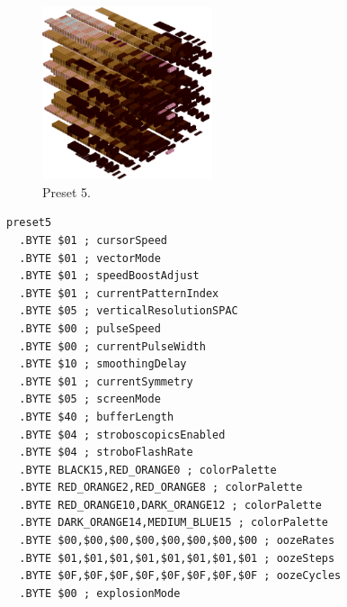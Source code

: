\vspace*{0.5cm}
\begin{minipage}[b]{0.48\linewidth}
\begin{figure}[H]                                                          
  \centering                                                             
  \begin{adjustbox}{width=5cm,center}                                   
  \includegraphics[width=5cm]{src/colorspace_presets/preset5-45.png}%
  \end{adjustbox}                                                        
\caption*{Preset 5.}                                           
\end{figure}                                                               
\end{minipage}
\hspace{0.1cm}
\begin{minipage}[b]{0.48\linewidth}                                                                         
\begin{lstlisting}[basicstyle=\ttfamily\tiny]
preset5
  .BYTE $01 ; cursorSpeed
  .BYTE $01 ; vectorMode
  .BYTE $01 ; speedBoostAdjust
  .BYTE $01 ; currentPatternIndex
  .BYTE $05 ; verticalResolutionSPAC
  .BYTE $00 ; pulseSpeed
  .BYTE $00 ; currentPulseWidth
  .BYTE $10 ; smoothingDelay
  .BYTE $01 ; currentSymmetry
  .BYTE $05 ; screenMode
  .BYTE $40 ; bufferLength
  .BYTE $04 ; stroboscopicsEnabled
  .BYTE $04 ; stroboFlashRate
  .BYTE BLACK15,RED_ORANGE0 ; colorPalette
  .BYTE RED_ORANGE2,RED_ORANGE8 ; colorPalette
  .BYTE RED_ORANGE10,DARK_ORANGE12 ; colorPalette
  .BYTE DARK_ORANGE14,MEDIUM_BLUE15 ; colorPalette
  .BYTE $00,$00,$00,$00,$00,$00,$00,$00 ; oozeRates
  .BYTE $01,$01,$01,$01,$01,$01,$01,$01 ; oozeSteps
  .BYTE $0F,$0F,$0F,$0F,$0F,$0F,$0F,$0F ; oozeCycles
  .BYTE $00 ; explosionMode
\end{lstlisting}
\end{minipage}
\clearpage
